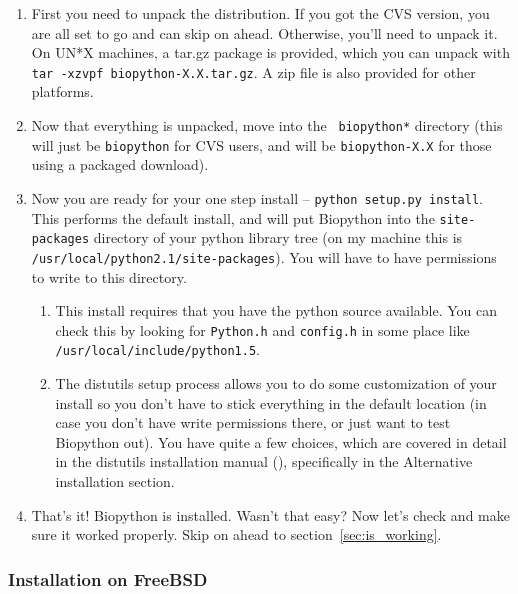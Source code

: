 \documentclass{report}
\begin{document}
\begin{enumerate}

\item First you need to unpack the distribution. If you got the CVS version, you are all set to go and can skip on ahead. Otherwise, you'll need to unpack it. On UN*X machines, a tar.gz package is provided, which you can unpack with \verb|tar -xzvpf biopython-X.X.tar.gz|. A zip file is also provided for other platforms.

\item Now that everything is unpacked, move into the \verb| biopython*| directory (this will just be \verb|biopython| for CVS users, and will be \verb|biopython-X.X| for those using a packaged download). 

\item Now you are ready for your one step install -- \verb|python setup.py install|. This performs the default install, and will put Biopython into the \verb|site-packages| directory of your python library tree (on my machine this is \verb|/usr/local/python2.1/site-packages|). You will have to have permissions to write to this directory. 

\begin{enumerate}

\item This install requires that you have the python source available. You can check this by looking for \verb|Python.h| and \verb|config.h| in some place like \verb|/usr/local/include/python1.5|.

\item The distutils setup process allows you to do some customization of your install so you don't have to stick everything in the default location (in case you don't have write permissions there, or just want to test Biopython out). You have quite a few choices, which are covered in detail in the distutils installation manual (), specifically in the Alternative installation section.

\end{enumerate}

\item That's it! Biopython is installed. Wasn't that easy? Now let's check and make sure it worked properly. Skip on ahead to section~\ref{sec:is_working}.

\end{enumerate}

\subsubsection{Installation on FreeBSD}
\end{document}
